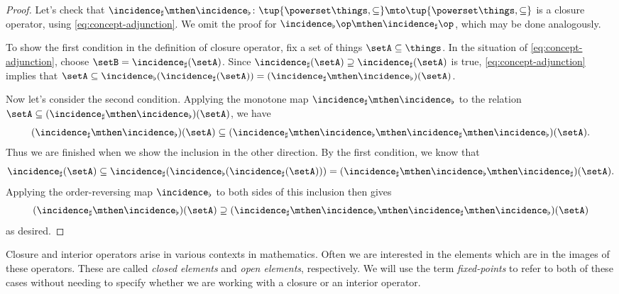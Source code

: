 \begin{proof}
Let's check that $\incidence_\sharp \mthen \incidence_\flat \colon \tup{\powerset \things, \subseteq} \mto \tup{\powerset \things, \subseteq}$ is a closure operator, using \cref{eq:concept-adjunction}. We omit the proof for $\incidence_\flat\op \mthen \incidence_\sharp\op$, which may be done analogously. 


To show the first condition in the definition of closure operator, fix a set of things $\setA \subseteq \things$. In the situation of \cref{eq:concept-adjunction}, choose $\setB = \incidence_\sharp(\setA)$. Since $\incidence_\sharp(\setA) \supseteq \incidence_\sharp(\setA)$ is true, \cref{eq:concept-adjunction} implies that $\setA \subseteq \incidence_\flat(\incidence_\sharp(\setA))  = (\incidence_\sharp \mthen \incidence_\flat)(\setA)$. 

Now let's consider the second condition. Applying the monotone map $\incidence_\sharp \mthen \incidence_\flat$ to the relation $\setA \subseteq (\incidence_\sharp \mthen \incidence_\flat)(\setA)$, we have
\begin{equation}
(\incidence_\sharp \mthen \incidence_\flat)(\setA)  \subseteq  (\incidence_\sharp \mthen \incidence_\flat \mthen \incidence_\sharp \mthen \incidence_\flat)(\setA).
\end{equation}
Thus we are finished when we show the inclusion in the other direction. By the first condition, we know that 
\begin{equation}
\incidence_\sharp(\setA) \subseteq \incidence_\sharp( \incidence_\flat (\incidence_\sharp(\setA))) = (\incidence_\sharp \mthen \incidence_\flat \mthen \incidence_\sharp)(\setA).
\end{equation}
Applying the order-reversing map $\incidence_\flat$ to both sides of this inclusion then gives 
\begin{equation}
(\incidence_\sharp \mthen \incidence_\flat)(\setA) \supseteq (\incidence_\sharp \mthen \incidence_\flat \mthen \incidence_\sharp \mthen \incidence_\flat)(\setA)
\end{equation}
as desired. 
\end{proof}

Closure and interior operators arise in various contexts in mathematics. Often we are interested in the elements which are in the images of these operators. These are called \emph{closed elements} and \emph{open elements}, respectively. We will use the term \emph{fixed-points} to refer to both of these cases without needing to specify whether we are working with a closure or an interior operator.  

